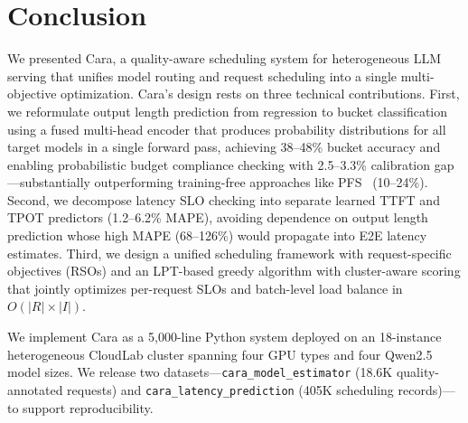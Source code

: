 \documentclass[letterpaper, anonymous, twocolumn, 10pt]{article}
\begin{document}
\section{Conclusion}

We presented Cara, a quality-aware scheduling system for heterogeneous LLM serving that unifies model routing and request scheduling into a single multi-objective optimization.
Cara's design rests on three technical contributions.
First, we reformulate output length prediction from regression to bucket classification using a fused multi-head encoder that produces probability distributions for all target models in a single forward pass, achieving 38--48\% bucket accuracy and enabling probabilistic budget compliance checking with 2.5--3.3\% calibration gap---substantially outperforming training-free approaches like PFS~\cite{Gong_2025} (10--24\%).
Second, we decompose latency SLO checking into separate learned TTFT and TPOT predictors (1.2--6.2\% MAPE), avoiding dependence on output length prediction whose high MAPE (68--126\%) would propagate into E2E latency estimates.
Third, we design a unified scheduling framework with request-specific objectives (RSOs) and an LPT-based greedy algorithm with cluster-aware scoring that jointly optimizes per-request SLOs and batch-level load balance in $O(|R| \times |I|)$.

We implement Cara as a 5,000-line Python system deployed on an 18-instance heterogeneous CloudLab cluster spanning four GPU types and four Qwen2.5 model sizes.
We release two datasets---\texttt{cara\_model\_estimator} (18.6K quality-annotated requests) and \texttt{cara\_latency\_prediction} (405K scheduling records)---to support reproducibility.

\end{document}
